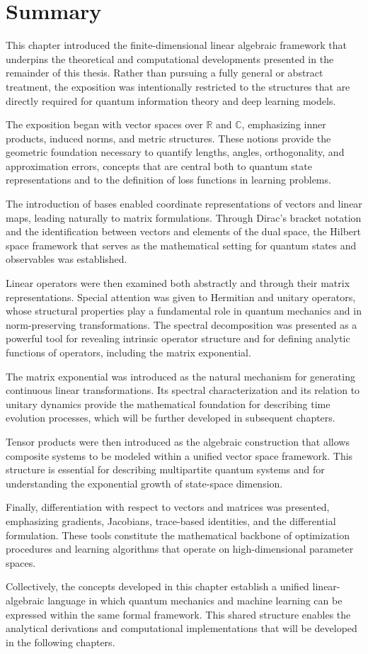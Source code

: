 \section{Summary}
This chapter introduced the finite-dimensional linear algebraic framework that underpins the theoretical and computational developments presented in the remainder of this thesis. Rather than pursuing a fully general or abstract treatment, the exposition was intentionally restricted to the structures that are directly required for quantum information theory and deep learning models.

The exposition began with vector spaces over $\mathbb{R}$ and $\mathbb{C}$, emphasizing inner products, induced norms, and metric structures. These notions provide the geometric foundation necessary to quantify lengths, angles, orthogonality, and approximation errors, concepts that are central both to quantum state representations and to the definition of loss functions in learning problems.

The introduction of bases enabled coordinate representations of vectors and linear maps, leading naturally to matrix formulations. Through Dirac's bracket notation and the identification between vectors and elements of the dual space, the Hilbert space framework that serves as the mathematical setting for quantum states and observables was established.

Linear operators were then examined both abstractly and through their matrix representations. Special attention was given to Hermitian and unitary operators, whose structural properties play a fundamental role in quantum mechanics and in norm-preserving transformations. The spectral decomposition was presented as a powerful tool for revealing intrinsic operator structure and for defining analytic functions of operators, including the matrix exponential.

The matrix exponential was introduced as the natural mechanism for generating continuous linear transformations. Its spectral characterization and its relation to unitary dynamics provide the mathematical foundation for describing time evolution processes, which will be further developed in subsequent chapters.

Tensor products were then introduced as the algebraic construction that allows composite systems to be modeled within a unified vector space framework. This structure is essential for describing multipartite quantum systems and for understanding the exponential growth of state-space dimension.

Finally, differentiation with respect to vectors and matrices was presented, emphasizing gradients, Jacobians, trace-based identities, and the differential formulation. These tools constitute the mathematical backbone of optimization procedures and learning algorithms that operate on high-dimensional parameter spaces.

Collectively, the concepts developed in this chapter establish a unified linear-algebraic language in which quantum mechanics and machine learning can be expressed within the same formal framework. This shared structure enables the analytical derivations and computational implementations that will be developed in the following chapters.
